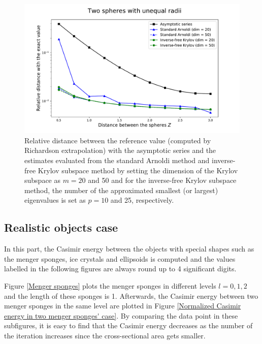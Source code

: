 \begin{figure}[H]
    \includegraphics[scale = 0.7]{figures/relative_distance_unequal_radii.pdf}
    \caption{Relative distance between the reference value (computed by Richardson extrapolation) with the asymptotic series and the estimates evaluated from 
    the standard Arnoldi method and inverse-free Krylov subspace method by setting the dimension of the Krylov subspace as $m = 20$ and 50 and for the inverse-free
    Krylov subspace method, the number of the approximated smallest (or largest) eigenvalues is set as $p = 10$ and 25, respectively.}
    \label{unequal_radii_rel_dist}
\end{figure}

\subsection{Realistic objects case}
In this part, the Casimir energy between the objects with special shapes such as the menger sponges, ice crystals and ellipsoids is computed and 
the values labelled in the following figures are always round up to 4 significant digits. 

Figure \ref{Menger sponges} plots the menger sponges in different levels $l = 0, 1, 2$ and the length of these sponges is 1. Afterwards, the Casimir 
energy between two menger sponges in the same level are plotted in Figure \ref{Normalized Casimir energy in two menger sponges' case}. By comparing the data 
point in these subfigures, it is easy to find that the Casimir energy decreases as the number of the iteration increases since the cross-sectional 
area gets smaller.

